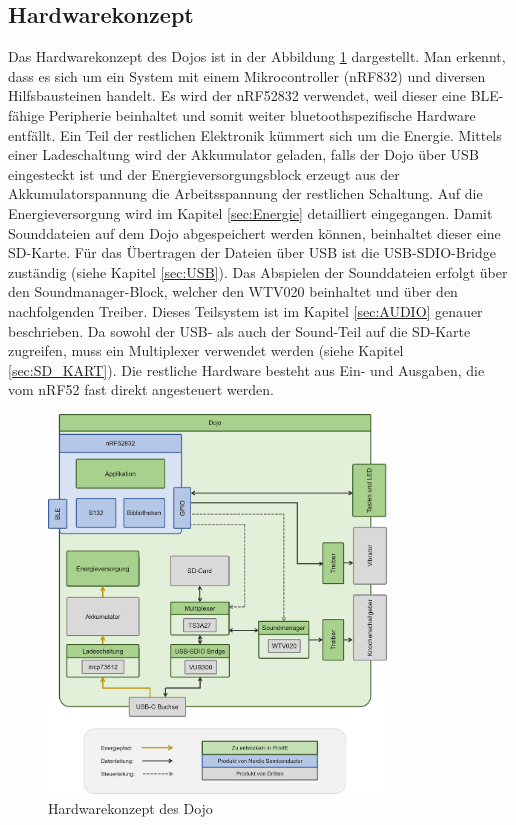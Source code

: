 \subsection{Hardwarekonzept}
  Das Hardwarekonzept des Dojos ist in der Abbildung \ref{fig:HWKonzept} dargestellt. 
  Man erkennt, dass es sich um ein System mit einem Mikrocontroller (nRF832) und diversen Hilfsbausteinen handelt. Es wird der nRF52832 verwendet, weil dieser eine BLE-fähige Peripherie beinhaltet und somit weiter bluetoothspezifische Hardware entfällt. 
  Ein Teil der restlichen Elektronik kümmert sich um die Energie. Mittels einer Ladeschaltung wird der Akkumulator geladen, falls der Dojo über USB eingesteckt ist und der Energieversorgungsblock erzeugt aus der Akkumulatorspannung die Arbeitsspannung der restlichen Schaltung. Auf die Energieversorgung wird im Kapitel \ref{sec:Energie} detailliert eingegangen.
  Damit Sounddateien auf dem Dojo abgespeichert werden können, beinhaltet dieser eine SD-Karte. Für das Übertragen der Dateien über USB ist die USB-SDIO-Bridge zuständig (siehe Kapitel \ref{sec:USB}).
  Das Abspielen der Sounddateien erfolgt über den Soundmanager-Block, welcher den WTV020 beinhaltet und über den nachfolgenden Treiber. Dieses Teilsystem ist im Kapitel \ref{sec:AUDIO} genauer beschrieben.
  Da sowohl der USB- als auch der Sound-Teil auf die SD-Karte zugreifen, muss ein Multiplexer verwendet werden (siehe Kapitel \ref{sec:SD_KART}). 
  Die restliche Hardware besteht aus Ein- und Ausgaben, die vom nRF52 fast direkt angesteuert werden.
  
  \begin{figure}[h]
    \centering
    \includegraphics[width=0.8\textwidth]{graphics/Dojo.png}
    \caption{Hardwarekonzept des Dojo}
    \label{fig:HWKonzept}
  \end{figure}


